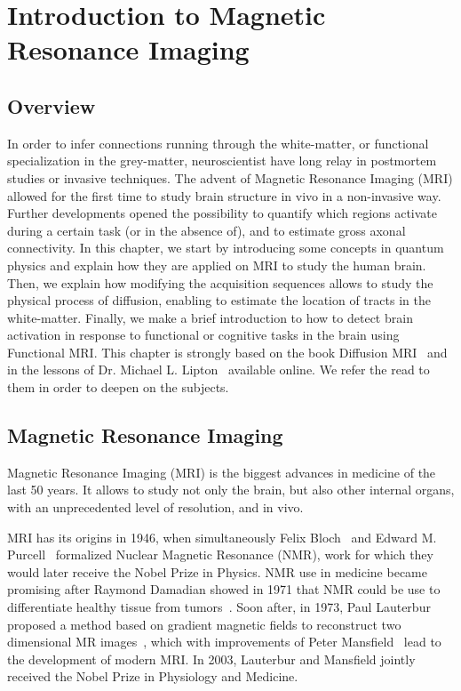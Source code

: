 \chapter{Introduction to Magnetic Resonance Imaging}
\label{ch:intro_mri}


\section{Overview}
In order to infer connections running through the white-matter, or functional
specialization in the grey-matter, neuroscientist have long relay in postmortem
studies or invasive techniques. The advent of Magnetic Resonance Imaging (MRI)
allowed for the first time to study brain structure in vivo in a non-invasive
way. Further developments opened the possibility to quantify which regions
activate during a certain task (or in the absence of), and to estimate gross
axonal connectivity. In this chapter, we start by
introducing some concepts in quantum physics and explain how they are
applied on MRI to study the human brain. Then, we explain how modifying the
acquisition sequences allows to study the physical process of diffusion,
enabling to estimate the location of tracts in the white-matter. Finally, we
make a brief introduction to how to detect brain activation in response to
functional or cognitive tasks in the brain using Functional MRI. This chapter
is strongly based on the book Diffusion MRI~ \cite{Basser2009} and in the 
lessons of Dr. Michael L. Lipton~\cite{Lipton2014} available online. We refer
the read to them in order to deepen on the subjects.

\section{Magnetic Resonance Imaging}

Magnetic Resonance Imaging (MRI) is the biggest advances in medicine of the
last 50 years. It allows to study not only the brain, but also other internal
organs, with an unprecedented level of resolution, and in vivo. 

MRI has its origins in 1946, when simultaneously Felix
Bloch~\cite{Bloch1946} and Edward M. Purcell~\cite{Purcell1946} formalized
Nuclear Magnetic Resonance (NMR), work for which they would later receive the
Nobel Prize in Physics. NMR use in medicine became promising after
Raymond Damadian showed in 1971 that NMR could be use to differentiate healthy
tissue from tumors~\cite{Reichson1971}. Soon after, in 1973, Paul Lauterbur 
proposed a method based on gradient magnetic fields to reconstruct two dimensional
MR images~\cite{Lauterbur1973}, which with improvements of Peter
Mansfield~\cite{Mansfield1977} lead to the development of modern MRI. In 2003,
Lauterbur and Mansfield jointly received the Nobel Prize in Physiology and
Medicine.

